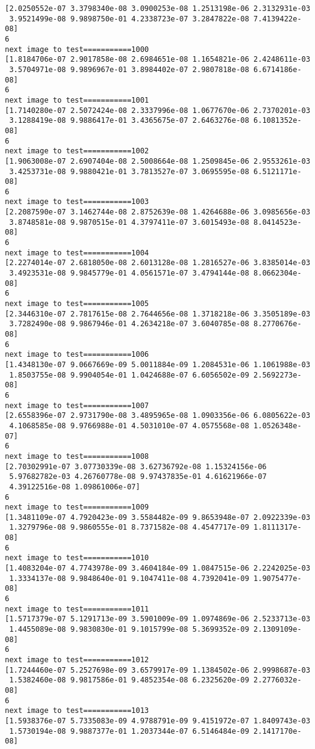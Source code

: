 \documentclass[11pt]{article}
\begin{document}
\begin{Verbatim}[commandchars=\\\{\}]
[2.0250552e-07 3.3798340e-08 3.0900253e-08 1.2513198e-06 2.3132931e-03
 3.9521499e-08 9.9898750e-01 4.2338723e-07 3.2847822e-08 7.4139422e-08]
6
next image to test===========1000
[1.8184706e-07 2.9017858e-08 2.6984651e-08 1.1654821e-06 2.4248611e-03
 3.5704971e-08 9.9896967e-01 3.8984402e-07 2.9807818e-08 6.6714186e-08]
6
next image to test===========1001
[1.7140280e-07 2.5072424e-08 2.3337996e-08 1.0677670e-06 2.7370201e-03
 3.1288419e-08 9.9886417e-01 3.4365675e-07 2.6463276e-08 6.1081352e-08]
6
next image to test===========1002
[1.9063008e-07 2.6907404e-08 2.5008664e-08 1.2509845e-06 2.9553261e-03
 3.4253731e-08 9.9880421e-01 3.7813527e-07 3.0695595e-08 6.5121171e-08]
6
next image to test===========1003
[2.2087590e-07 3.1462744e-08 2.8752639e-08 1.4264688e-06 3.0985656e-03
 3.8748581e-08 9.9870515e-01 4.3797411e-07 3.6015493e-08 8.0414523e-08]
6
next image to test===========1004
[2.2274014e-07 2.6818050e-08 2.6013128e-08 1.2816527e-06 3.8385014e-03
 3.4923531e-08 9.9845779e-01 4.0561571e-07 3.4794144e-08 8.0662304e-08]
6
next image to test===========1005
[2.3446310e-07 2.7817615e-08 2.7644656e-08 1.3718218e-06 3.3505189e-03
 3.7282490e-08 9.9867946e-01 4.2634218e-07 3.6040785e-08 8.2770676e-08]
6
next image to test===========1006
[1.4348130e-07 9.0667669e-09 5.0011884e-09 1.2084531e-06 1.1061988e-03
 1.8503755e-08 9.9904054e-01 1.0424688e-07 6.6056502e-09 2.5692273e-08]
6
next image to test===========1007
[2.6558396e-07 2.9731790e-08 3.4895965e-08 1.0903356e-06 6.0805622e-03
 4.1068585e-08 9.9766988e-01 4.5031010e-07 4.0575568e-08 1.0526348e-07]
6
next image to test===========1008
[2.70302991e-07 3.07730339e-08 3.62736792e-08 1.15324156e-06
 5.97682782e-03 4.26760778e-08 9.97437835e-01 4.61621966e-07
 4.39122516e-08 1.09861006e-07]
6
next image to test===========1009
[1.3481109e-07 4.7920423e-09 3.5584482e-09 9.8653948e-07 2.0922339e-03
 1.3279796e-08 9.9860555e-01 8.7371582e-08 4.4547717e-09 1.8111317e-08]
6
next image to test===========1010
[1.4083204e-07 4.7743978e-09 3.4604184e-09 1.0847515e-06 2.2242025e-03
 1.3334137e-08 9.9848640e-01 9.1047411e-08 4.7392041e-09 1.9075477e-08]
6
next image to test===========1011
[1.5717379e-07 5.1291713e-09 3.5901009e-09 1.0974869e-06 2.5233713e-03
 1.4455089e-08 9.9830830e-01 9.1015799e-08 5.3699352e-09 2.1309109e-08]
6
next image to test===========1012
[1.7244460e-07 5.2527698e-09 3.6579917e-09 1.1384502e-06 2.9998687e-03
 1.5382460e-08 9.9817586e-01 9.4852354e-08 6.2325620e-09 2.2776032e-08]
6
next image to test===========1013
[1.5938376e-07 5.7335083e-09 4.9788791e-09 9.4151972e-07 1.8409743e-03
 1.5730194e-08 9.9887377e-01 1.2037344e-07 6.5146484e-09 2.1417170e-08]

\end{Verbatim}
\end{document}
